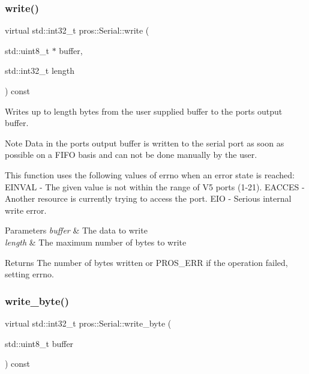 \subsubsection{\texorpdfstring{write()}{write()}}
{\footnotesize\ttfamily virtual std\+::int32\+\_\+t pros\+::\+Serial\+::write (\begin{DoxyParamCaption}\item[{std\+::uint8\+\_\+t $\ast$}]{buffer,  }\item[{std\+::int32\+\_\+t}]{length }\end{DoxyParamCaption}) const\hspace{0.3cm}{\ttfamily [virtual]}}

Writes up to length bytes from the user supplied buffer to the port\textquotesingle{}s output buffer.

\begin{DoxyNote}{Note}
Data in the port\textquotesingle{}s output buffer is written to the serial port as soon as possible on a F\+I\+FO basis and can not be done manually by the user.
\end{DoxyNote}
This function uses the following values of errno when an error state is reached\+: E\+I\+N\+V\+AL -\/ The given value is not within the range of V5 ports (1-\/21). E\+A\+C\+C\+ES -\/ Another resource is currently trying to access the port. E\+IO -\/ Serious internal write error.


\begin{DoxyParams}{Parameters}
{\em buffer} & The data to write \\
\hline
{\em length} & The maximum number of bytes to write\\
\hline
\end{DoxyParams}
\begin{DoxyReturn}{Returns}
The number of bytes written or P\+R\+O\+S\+\_\+\+E\+RR if the operation failed, setting errno. 
\end{DoxyReturn}
\mbox{\label{classpros_1_1Serial_a16477199d136d4f2ccbc73281d03965b}} 
\subsubsection{\texorpdfstring{write\+\_\+byte()}{write\_byte()}}
{\footnotesize\ttfamily virtual std\+::int32\+\_\+t pros\+::\+Serial\+::write\+\_\+byte (\begin{DoxyParamCaption}\item[{std\+::uint8\+\_\+t}]{buffer }\end{DoxyParamCaption}) const\hspace{0.3cm}{\ttfamily [virtual]}}

